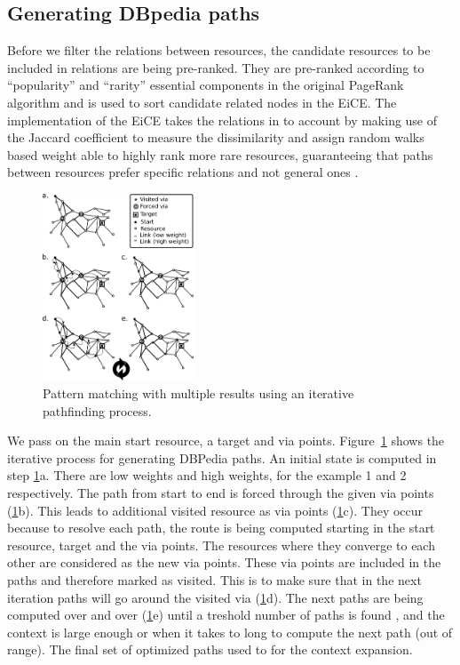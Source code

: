 \documentclass{acm_proc_article-sp}
\begin{document}
\subsection{Generating DBpedia paths}

Before we filter the relations between resources, the candidate resources to be included in relations are being pre-ranked. They are pre-ranked according to ``popularity'' and ``rarity'' essential components in the original PageRank algorithm \cite{page1999pagerank} and is used to sort candidate related nodes in the EiCE. The implementation of the EiCE takes the relations in to account by making use of the Jaccard coefficient to measure the dissimilarity and assign random walks based weight able to highly rank more rare resources, guaranteeing that paths between resources prefer specific relations and not general ones \cite{moore2012novel}.

\begin{figure}[h!]
\centering
\includegraphics[width=0.4\textwidth]{graphmultipatternmatching.png}
\caption{Pattern matching with multiple results using an iterative pathfinding process.}
\label{fig:patternmatching}
\end{figure}

We pass on the main start resource, a target and via points. Figure~\ref{fig:patternmatching} shows the iterative process for generating DBPedia paths. An initial state is computed in step \ref{fig:patternmatching}a. There are low weights and high weights, for the example 1 and 2 respectively. The path from start to end is forced through the given via points (\ref{fig:patternmatching}b). This leads to additional visited resource as via points (\ref{fig:patternmatching}c). They occur because to resolve each path, the route is being computed starting in the start resource, target and the via points. The resources where they converge to each other are considered as the new via points. These via points are included in the paths and therefore marked as visited. This is to make sure that in the next iteration paths will go around the visited via (\ref{fig:patternmatching}d). The next paths are being computed over and over (\ref{fig:patternmatching}e) until a treshold number of paths is found , and the context is large enough or when it takes to long to compute the next path (out of range). The final set of optimized paths used to for the context expansion.
\end{document}

